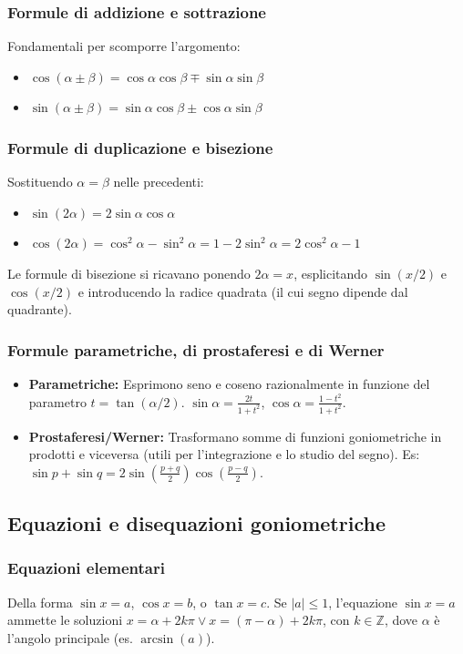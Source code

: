 \subsubsection{Formule di addizione e sottrazione}
Fondamentali per scomporre l'argomento:
\begin{itemize}
    \item $\cos(\alpha \pm \beta) = \cos\alpha\cos\beta \mp \sin\alpha\sin\beta$
    \item $\sin(\alpha \pm \beta) = \sin\alpha\cos\beta \pm \cos\alpha\sin\beta$
\end{itemize}

\subsubsection{Formule di duplicazione e bisezione}
Sostituendo $\alpha = \beta$ nelle precedenti:
\begin{itemize}
    \item $\sin(2\alpha) = 2\sin\alpha\cos\alpha$
    \item $\cos(2\alpha) = \cos^2\alpha - \sin^2\alpha = 1 - 2\sin^2\alpha = 2\cos^2\alpha - 1$
\end{itemize}
Le formule di bisezione si ricavano ponendo $2\alpha = x$, esplicitando $\sin(x/2)$ e $\cos(x/2)$ e introducendo la radice quadrata (il cui segno dipende dal quadrante).

\subsubsection{Formule parametriche, di prostaferesi e di Werner}
\begin{itemize}
    \item \textbf{Parametriche:} Esprimono seno e coseno razionalmente in funzione del parametro $t = \tan(\alpha/2)$. $\sin\alpha = \frac{2t}{1+t^2}$, $\cos\alpha = \frac{1-t^2}{1+t^2}$.
    \item \textbf{Prostaferesi/Werner:} Trasformano somme di funzioni goniometriche in prodotti e viceversa (utili per l'integrazione e lo studio del segno). Es: $\sin p + \sin q = 2\sin\left(\frac{p+q}{2}\right)\cos\left(\frac{p-q}{2}\right)$.
\end{itemize}

\subsection{Equazioni e disequazioni goniometriche}
\subsubsection{Equazioni elementari}
Della forma $\sin x = a$, $\cos x = b$, o $\tan x = c$. 
Se $|a| \le 1$, l'equazione $\sin x = a$ ammette le soluzioni $x = \alpha + 2k\pi \lor x = (\pi - \alpha) + 2k\pi$, con $k \in \mathbb{Z}$, dove $\alpha$ è l'angolo principale (es. $\arcsin(a)$).

